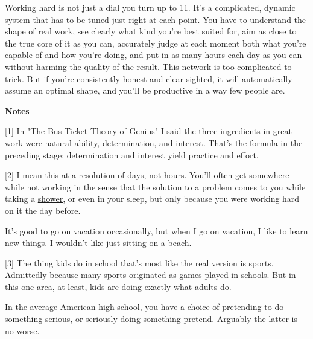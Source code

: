 Working hard is not
                  just a dial you turn up to 11. It's a complicated, dynamic
                  system that has to be tuned just right at each point. You have
                  to understand the shape of real work, see clearly what kind
                  you're best suited for, aim as close to the true core of it as
                  you can, accurately judge at each moment both what you're
                  capable of and how you're doing, and put in as many hours each
                  day as you can without harming the quality of the result. This
                  network is too complicated to trick. But if you're
                  consistently honest and clear-sighted, it will automatically
                  assume an optimal shape, and you'll be productive in a way few
                  people are.











\textbf{Notes}

[1] In "The Bus Ticket Theory of Genius" I said the three
                  ingredients in great work were natural ability, determination,
                  and interest. That's the formula in the preceding stage;
                  determination and interest yield practice and effort.

[2] I mean this at a resolution of days, not hours. You'll
                  often get somewhere while not working in the sense that the
                  solution to a problem comes to you while taking a
                  \href{http://www.paulgraham.com/top.html}{\underline{shower}}, or even in your sleep, but only because you were working
                  hard on it the day before.

It's good to go on
                  vacation occasionally, but when I go on vacation, I like to
                  learn new things. I wouldn't like just sitting on a beach.

[3] The thing kids do in school that's most like the real
                  version is sports. Admittedly because many sports originated
                  as games played in schools. But in this one area, at least,
                  kids are doing exactly what adults do.

In the
                  average American high school, you have a choice of pretending
                  to do something serious, or seriously doing something pretend.
                  Arguably the latter is no worse.

